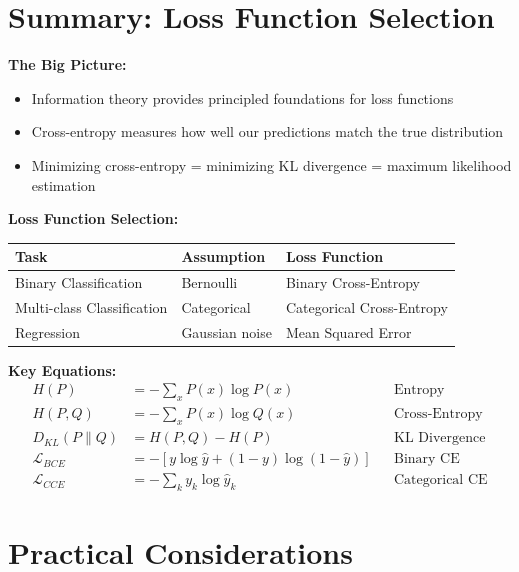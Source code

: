 \section{Summary: Loss Function Selection}

\begin{summary}
\textbf{The Big Picture:}
\begin{itemize}
    \item Information theory provides principled foundations for loss functions
    \item Cross-entropy measures how well our predictions match the true distribution
    \item Minimizing cross-entropy = minimizing KL divergence = maximum likelihood estimation
\end{itemize}

\textbf{Loss Function Selection:}
\begin{center}
\begin{tabular}{lll}
\toprule
\textbf{Task} & \textbf{Assumption} & \textbf{Loss Function} \\
\midrule
Binary Classification & Bernoulli & Binary Cross-Entropy \\
Multi-class Classification & Categorical & Categorical Cross-Entropy \\
Regression & Gaussian noise & Mean Squared Error \\
\bottomrule
\end{tabular}
\end{center}

\textbf{Key Equations:}
\begin{align}
H(P) &= -\sum_x P(x) \log P(x) && \text{Entropy} \\[0.5em]
H(P, Q) &= -\sum_x P(x) \log Q(x) && \text{Cross-Entropy} \\[0.5em]
D_{KL}(P \| Q) &= H(P, Q) - H(P) && \text{KL Divergence} \\[0.5em]
\mathcal{L}_{BCE} &= -[y \log \hat{y} + (1-y)\log(1-\hat{y})] && \text{Binary CE} \\[0.5em]
\mathcal{L}_{CCE} &= -\sum_k y_k \log \hat{y}_k && \text{Categorical CE}
\end{align}
\end{summary}

\section{Practical Considerations}

